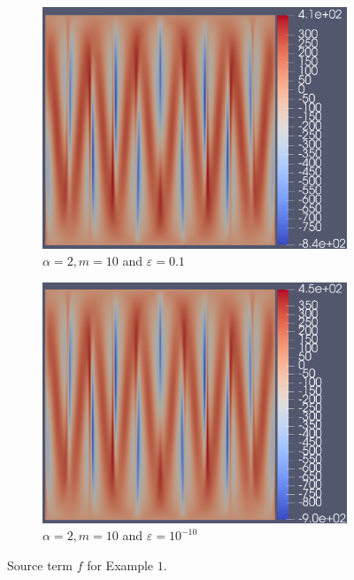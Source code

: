 \documentclass[12pt]{ociamthesis}
\begin{document}
\begin{figure}[H]
\begin{subfigure}{0.44\textwidth}
     \includegraphics[width=\textwidth]{Pics/uf/F_E1c_eps_1.png}
     \caption{$\alpha=2, m=10$ and $\varepsilon = 0.1$}
 \end{subfigure}
 \hfill
 \begin{subfigure}{0.44\textwidth}
     \includegraphics[width=\textwidth]{Pics/uf/f_E1c_eps_10.png}
     \caption{$\alpha=2, m=10$ and $\varepsilon = 10^{-10}$}
 \end{subfigure}
 \caption{Source term $f$ for Example $1$.} \label{E1_fs}
\end{figure}
\end{document}
